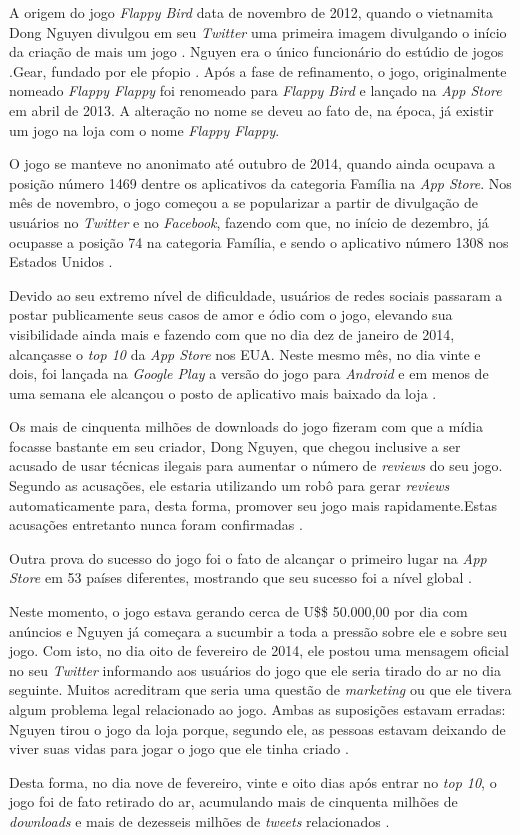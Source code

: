A origem do jogo \textit{Flappy Bird} data de novembro de 2012, quando o vietnamita Dong Nguyen divulgou em seu \textit{Twitter} uma primeira imagem divulgando o início da criação de mais um jogo \cite{Warren2014}. Nguyen era o único funcionário do estúdio de jogos .Gear, fundado por ele pŕopio \cite{Harvard2014}. Após a fase de refinamento, o jogo, originalmente nomeado \textit{Flappy Flappy} foi renomeado para \textit{Flappy Bird} e lançado na \textit{App Store} em abril de 2013. A alteração no nome se deveu ao fato de, na época, já existir um jogo na loja com o nome \textit{Flappy Flappy}.

O jogo se manteve no anonimato até outubro de 2014, quando ainda ocupava a posição número 1469 dentre os aplicativos da categoria Família na \textit{App Store}. Nos mês de novembro, o jogo começou a se popularizar a partir de divulgação de usuários no \textit{Twitter} e no \textit{Facebook}, fazendo com que, no início de dezembro, já ocupasse a posição 74 na categoria Família, e sendo o aplicativo número 1308 nos Estados Unidos \cite{Warren2014}.

Devido ao seu extremo nível de dificuldade, usuários de redes sociais passaram a postar publicamente seus casos de amor e ódio com o jogo, elevando sua visibilidade ainda mais e fazendo com que no dia dez de janeiro de 2014, alcançasse o \textit{top 10} da \textit{App Store} nos EUA. Neste mesmo mês, no dia vinte e dois, foi lançada na \textit{Google Play} a versão do jogo para \textit{Android} e em menos de uma semana ele alcançou o posto de aplicativo mais baixado da loja \cite{Warren2014}.

Os mais de cinquenta milhões de downloads do jogo fizeram com que a mídia focasse bastante em seu criador, Dong Nguyen, que chegou inclusive a ser acusado de usar técnicas ilegais para aumentar o número de \textit{reviews} do seu jogo. Segundo as acusações, ele estaria utilizando um robô para gerar \textit{reviews} automaticamente para, desta forma, promover seu jogo mais rapidamente.Estas acusações entretanto nunca foram confirmadas \cite{Warren2014}.

Outra prova do sucesso do jogo foi o fato de alcançar o primeiro lugar na \textit{App Store} em 53 países diferentes, mostrando que seu sucesso foi a nível global \cite{Warren2014}.

Neste momento, o jogo estava gerando cerca de U\$\$ 50.000,00 por dia com anúncios e Nguyen já começara a sucumbir a toda a pressão sobre ele e sobre seu jogo. Com isto, no dia oito de fevereiro de 2014, ele postou uma mensagem oficial no seu \textit{Twitter} informando aos usuários do jogo que ele seria tirado do ar no dia seguinte. Muitos acreditram que seria uma questão de \textit{marketing} ou que ele tivera algum problema legal relacionado ao jogo. Ambas as suposições estavam erradas: Nguyen tirou o jogo da loja porque, segundo ele, as pessoas estavam deixando de viver suas vidas para jogar o jogo que ele tinha criado \cite{Warren2014}.

Desta forma, no dia nove de fevereiro, vinte e oito dias após entrar no \textit{top 10}, o jogo foi de fato retirado do ar, acumulando mais de cinquenta milhões de \textit{downloads} e mais de dezesseis milhões de \textit{tweets} relacionados \cite{Warren2014}.


